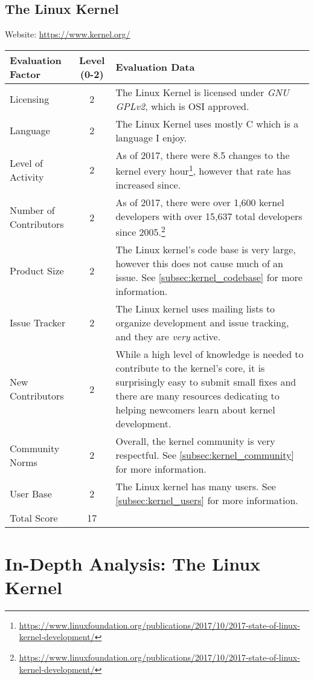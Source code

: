 \documentclass[11pt]{article}
\begin{document}
\subsection{The Linux Kernel}
\nopagebreak
Website: \url{https://www.kernel.org/}
\nopagebreak
\begin{center}
\begin{tabularx}{\textwidth}{|l|c|X|}
	\hline
	\textbf{Evaluation Factor} & \textbf{Level (0-2)} & \textbf{Evaluation Data} \\\hline
	Licensing & 2 & The Linux Kernel is licensed under \textit{GNU GPLv2}, which is OSI approved.\\\hline
	Language & 2 & The Linux Kernel uses mostly C which is a language I enjoy.\\\hline
	Level of Activity & 2 & As of 2017, there were 8.5 changes to the kernel every hour\footnote{\url{https://www.linuxfoundation.org/publications/2017/10/2017-state-of-linux-kernel-development/}}, however that rate has increased since.\\\hline
	Number of Contributors & 2 & As of 2017, there were over 1,600 kernel developers with over 15,637 total developers since 2005.\footnote{\url{https://www.linuxfoundation.org/publications/2017/10/2017-state-of-linux-kernel-development/}}\\\hline
	Product Size & 2 & The Linux kernel's code base is very large, however this does not cause much of an issue.  See \ref{subsec:kernel_codebase} for more information.\\\hline
	Issue Tracker & 2 & The Linux kernel uses mailing lists to organize development and issue tracking, and they are \textit{very} active.\\\hline
	New Contributors & 2 & While a high level of knowledge is needed to contribute to the kernel's core, it is surprisingly easy to submit small fixes and there are many resources dedicating to helping newcomers learn about kernel development.\\\hline
	Community Norms & 2 & Overall, the kernel community is very respectful.  See \ref{subsec:kernel_community} for more information.\\\hline
	User Base & 2 & The Linux kernel has many users.  See \ref{subsec:kernel_users} for more information.\\\hline
	Total Score & 17 & \\\hline
\end{tabularx}
\end{center}

\section{In-Depth Analysis: The Linux Kernel}
\end{document}
